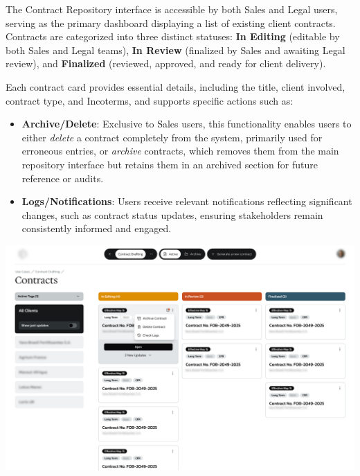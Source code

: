 The Contract Repository interface is accessible by both Sales and Legal users, serving as the primary dashboard displaying a list of existing client contracts. Contracts are categorized into three distinct statuses: \textbf{In Editing} (editable by both Sales and Legal teams), \textbf{In Review} (finalized by Sales and awaiting Legal review), and \textbf{Finalized} (reviewed, approved, and ready for client delivery).

Each contract card provides essential details, including the title, client involved, contract type, and Incoterms, and supports specific actions such as:

\begin{itemize}
    \item \textbf{Archive/Delete}: Exclusive to Sales users, this functionality enables users to either \textit{delete} a contract completely from the system, primarily used for erroneous entries, or \textit{archive} contracts, which removes them from the main repository interface but retains them in an archived section for future reference or audits.
    \item \textbf{Logs/Notifications}: Users receive relevant notifications reflecting significant changes, such as contract status updates, ensuring stakeholders remain consistently informed and engaged.
\end{itemize}

\begin{center}
    \centering
    \includegraphics[width=1\textwidth]{Images/Contract Repository Page.png}
    \label{fig:contract_repository_page}
\end{center}

